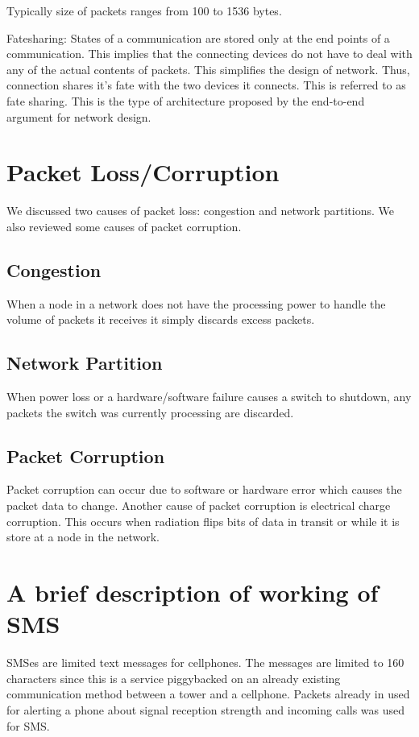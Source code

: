 ﻿\documentclass[twoside]{article}
\begin{document}
Typically size of packets ranges from 100 to 1536 bytes.

Fatesharing: States of a communication are stored only at the end points of a communication. This implies that the connecting devices
do not have to deal with any of the actual contents of packets. This simplifies the design of network. Thus, connection shares it's
fate with the two devices it connects. This is referred to as fate sharing. This is the type of architecture proposed by the end-to-end
argument for network design.


\section{Packet Loss/Corruption}
We discussed two causes of packet loss: congestion and network partitions.
We also reviewed some causes of packet corruption.

\subsection{Congestion}
When a node in a network does not have the processing power to handle
the volume of packets it receives it simply discards excess packets.

\subsection{Network Partition}
When power loss or a hardware/software failure causes a switch to shutdown,
any packets the switch was currently processing are discarded.

\subsection{Packet Corruption}
Packet corruption can occur due to software or hardware error which
causes the packet data to change. Another cause of packet corruption
is electrical charge corruption. This occurs when radiation flips bits
of data in transit or while it is store at a node in the network.

\section{A brief description of working of SMS}
SMSes are limited text messages for cellphones. The messages are limited to 160 characters since
this is a service  piggybacked on an already existing communication method between a tower and a cellphone. Packets already in used for 
alerting a phone about signal reception strength and incoming calls was used for SMS.
\end{document}
